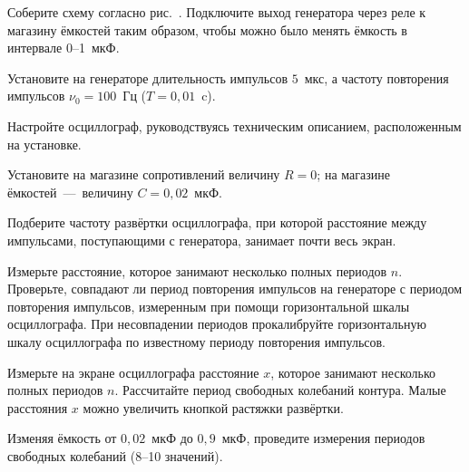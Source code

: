 \begin{lab:task}




	\item Соберите схему согласно рис.~. Подключите
выход генератора через реле к магазину ёмкостей таким образом, чтобы можно было
менять ёмкость в интервале 0--1~мкФ.

	\item Установите на генераторе длительность импульсов $5$~мкс, а частоту
повторения импульсов $\nu_0 = 100$~Гц ($T = 0,01$~c).

	\item Настройте осциллограф, руководствуясь техническим описанием,
расположенным на установке.


	\item Установите на магазине сопротивлений величину $R = 0$; на магазине
ёмкостей~---~величину $C = 0,02$~мкФ.

	\item Подберите частоту развёртки осциллографа, при которой расстояние между
импульсами, поступающими с генератора, занимает почти весь экран.

	\item Измерьте расстояние, которое занимают несколько полных периодов $n$.
Проверьте, совпадают ли период повторения импульсов на генераторе с периодом
повторения импульсов, измеренным при помощи горизонтальной шкалы осциллографа.
При несовпадении периодов прокалибруйте горизонтальную шкалу осциллографа по
известному периоду повторения импульсов.

	\item Измерьте на экране осциллографа расстояние $x$, которое занимают
несколько полных периодов $n$. Рассчитайте период свободных колебаний контура.
Малые расстояния $x$ можно увеличить кнопкой растяжки развёртки.

	\item Изменяя ёмкость от $0,02$~мкФ до $0,9$~мкФ, проведите измерения
периодов свободных колебаний (8--10 значений).




\end{lab:task}
